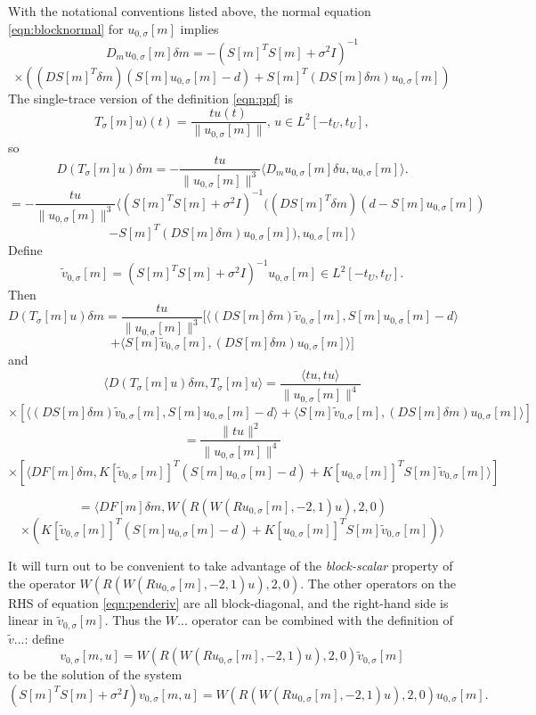 With the notational conventions listed above, the normal equation \ref{eqn:blocknormal} for $u_{0,\sigma}[m]$ implies
\[
  D_mu_{0,\sigma}[m] \delta m = -(S[m]^TS[m] + \sigma^2I)^{-1}
\]
\begin{equation}
  \label{eqn:blockderiv}
  \times ((DS[m]^{T}\delta m) (S[m]u_{0,\sigma}[m]-d) + S[m]^T(DS[m]\delta m) u_{0,\sigma}[m])
\end{equation}
The single-trace version of the definition \ref{eqn:ppf} is
\[
  T_{\sigma}[m]u)(t) = \frac{t u(t)}{\|u_{0,\sigma}[m]\|},\,u \in L^2[-t_U,t_U],
\]
so
\[
D(T_{\sigma}[m] u)\delta m = -\frac{t u}{\|u_{0,\sigma}[m]\|^3}\langle D_mu_{0,\sigma}[m]\delta u, u_{0,\sigma}[m]\rangle.
\]
\[
  =-\frac{t u}{\|u_{0,\sigma}[m]\|^3}\langle  (S[m]^TS[m] +
  \sigma^2I)^{-1}((DS[m]^{T}\delta m) (d - S[m]u_{0,\sigma}[m])
\]
\[
   - S[m]^T(DS[m]\delta m) u_{0,\sigma}[m]), u_{0,\sigma}[m] \rangle
\]
Define
\begin{equation}
  \label{eqn:defv0tilde}
  \tilde{v}_{0,\sigma}[m] = (S[m]^TS[m]+ \sigma^2I)^{-1} u_{0,\sigma}[m] \in
  L^2[-t_U,t_U].
\end{equation}
Then
\[
  D(T_{\sigma}[m] u)\delta m =
  \frac{t u}{\|u_{0,\sigma}[m]\|^3}[\langle (DS[m]\delta
  m)\tilde{v}_{0,\sigma}[m], S[m]u_{0,\sigma}[m]-d\rangle
\]
\[+
  \langle S[m]\tilde{v}_{0,\sigma}[m], (DS[m]\delta m) u_{0,\sigma}[m] \rangle ]
\]
and
\[
  \langle D(T_{\sigma}[m]u)\delta m, T_{\sigma}[m]u\rangle =
\frac{\langle t u, tu \rangle}{\|u_{0,\sigma}[m]\|^4}
\]
\[
\times [\langle (DS[m]\delta
  m)\tilde{v}_{0,\sigma}[m], S[m]u_{0,\sigma}[m]-d\rangle
+
  \langle S[m]\tilde{v}_{0,\sigma}[m], (DS[m]\delta m) u_{0,\sigma}[m] \rangle ]
\]
\[
  = \frac {\|t u\|^2}{\|u_{0,\sigma}[m]\|^4}
\]
\[
  \times [\langle DF[m]\delta m, K[\tilde{v}_{0,\sigma}[m]]^T(S[m]u_{0,\sigma}[m]-d)
+
K[u_{0,\sigma}[m]]^T S[m]\tilde{v}_{0,\sigma}[m]\rangle ]
\]

\[
  = \langle DF[m]\delta m, W(R(W(Ru_{0,\sigma}[m],-2,1)u),2,0)
\]
\begin{equation}
  \label{eqn:penderiv}
  \times ( K[\tilde{v}_{0,\sigma}[m]]^T(S[m]u_{0,\sigma}[m]-d)
+
K[u_{0,\sigma}[m]]^T S[m]\tilde{v}_{0,\sigma}[m])\rangle
\end{equation}

It will turn out to be convenient to take advantage of the {\em
  block-scalar} property of the operator
$W(R(W(Ru_{0,\sigma}[m],-2,1)u),2,0)$. The other operators on the RHS
of equation \ref{eqn:penderiv} are all block-diagonal, and the
right-hand side is linear in $\tilde{v}_{0,\sigma}[m]$. Thus the
$W...$ operator can be combined with the definition of $\tilde{v}...$:
define
\[
  v_{0,\sigma}[m,u]=W(R(W(Ru_{0,\sigma}[m],-2,1)u),2,0) \tilde{v}_{0,\sigma}[m]
\]
to be the solution of the system
\begin{equation}
  \label{eqn:defv0}
  (S[m]^TS[m]+ \sigma^2I) v_{0,\sigma}[m,u] = W(R(W(Ru_{0,\sigma}[m],-2,1)u),2,0) u_{0,\sigma}[m].
\end{equation}

